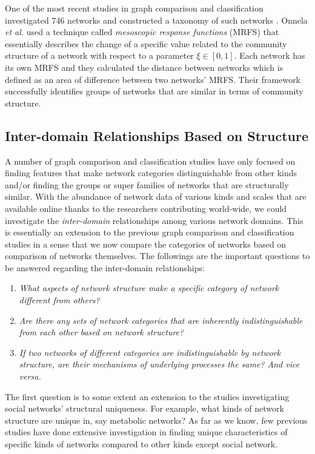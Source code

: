 \documentclass{article}
\begin{document}
	One of the most recent studies in graph comparison and classification investigated 746 networks and constructed a taxonomy of such networks \cite{Onnela_Taxonomy}.  Onnela \textit{et al.} used a technique called \textit{mesoscopic response functions} (MRFS) that essentially describes the change of a specific value related to the community structure of a network with respect to a parameter $\xi \in [0,1]$. Each network has its own MRFS and they calculated the distance between networks which is defined as an area of difference between two networks' MRFS. Their framework successfully identifies groups of networks that are similar in terms of community structure.

	
	\subsection{Inter-domain Relationships Based on Structure}
	A number of graph comparison and classification studies have only focused on finding features that make network categories distinguishable from other kinds and/or finding the groups or super families of networks that are structurally similar. With the abundance of network data of various kinds and scales that are available online thanks to the researchers contributing world-wide, we could investigate the \textit{inter-domain} relationships among various network domains. This is essentially an extension to the previous graph comparison and classification studies in a sense that we now compare the categories of networks based on comparison of networks themselves. The followings are the important questions to be answered regarding the inter-domain relationships:
	
\begin{enumerate}
	\item \textit{What aspects of network structure make a specific category of network different from others?}
	\item \textit{Are there any sets of network categories that are inherently indistinguishable from each other based on network structure?} 
	\item \textit{If two networks of different categories are indistinguishable by network structure, are their mechanisms of underlying processes the same? And vice versa.}
\end{enumerate}

The first question is to some extent an extension to the studies investigating social networks' structural uniqueness. For example, what kinds of network structure are unique in, say metabolic networks? As far as we know, few previous studies have done extensive investigation in finding unique characteristics of specific kinds of networks compared to other kinds except social network.
\end{document}
